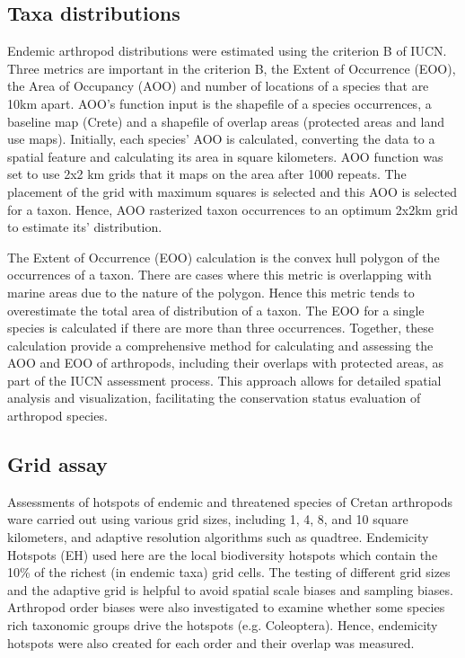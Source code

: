     \subsection{Taxa distributions}
    \label{subsec:arthropods-eoo-aoo}

Endemic arthropod distributions were estimated using the criterion B of IUCN. 
Three metrics are important in the criterion B, the Extent of Occurrence (EOO),
the Area of Occupancy (AOO) and 
number of locations of a species that are 10km apart.
AOO's function input is the shapefile of a species occurrences,
a baseline map (Crete) and a shapefile of overlap areas (protected areas and land use maps).
Initially, each species' AOO is calculated, converting the data to a spatial feature
and calculating its area in square kilometers. 
AOO function was set to use 2x2 km grids that it maps on the area after 1000
repeats. The placement of the grid with maximum squares is selected and this AOO 
is selected for a taxon. Hence, AOO rasterized taxon occurrences to an optimum 
2x2km grid to estimate its' distribution.

The Extent of Occurrence (EOO) calculation is the convex hull polygon of the occurrences 
of a taxon. There are cases where this metric is overlapping with marine areas due 
to the nature of the polygon. Hence this metric tends to overestimate the 
total area of distribution of a taxon.
The EOO for a single species is calculated if there are more than three occurrences.
Together, these calculation provide a comprehensive method for calculating and
assessing the AOO and EOO of arthropods, including their overlaps with protected
areas, as part of the IUCN assessment process. This approach allows for detailed
spatial analysis and visualization, facilitating the conservation status evaluation of arthropod species.


    \subsection{Grid assay}
    \label{subsec:arthropods-ehs-kbas}

Assessments of hotspots of endemic and threatened species of Cretan arthropods
ware carried out using various grid sizes, including 1, 4, 8, and 10 square kilometers, and
adaptive resolution algorithms such as quadtree. 
Endemicity Hotspots (EH) used here are the local biodiversity hotspots which contain
the 10\% of the richest (in endemic taxa) grid cells.
The testing of different grid sizes and the adaptive grid is helpful to avoid 
spatial scale biases and sampling biases.
Arthropod order biases were also investigated to examine whether some species
rich taxonomic groups drive the hotspots (e.g. Coleoptera). Hence, endemicity 
hotspots were also created for each order and their overlap was measured.

